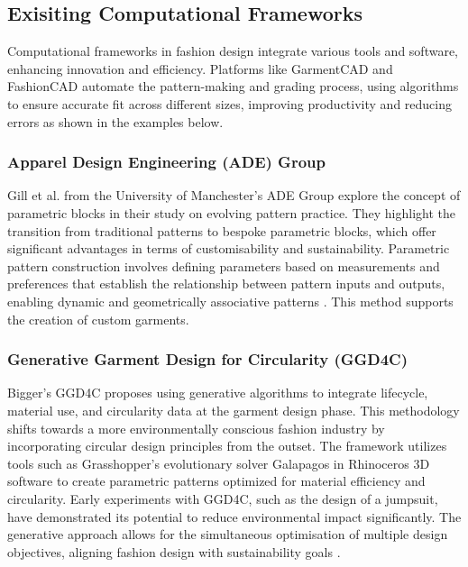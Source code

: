 \subsection{Exisiting Computational Frameworks}
Computational frameworks in fashion design integrate various tools and software, enhancing innovation and efficiency. Platforms like GarmentCAD and FashionCAD automate the pattern-making and grading process, using algorithms to ensure accurate fit across different sizes, improving productivity and reducing errors as shown in the examples below.

\subsubsection{Apparel Design Engineering (ADE) Group}
Gill et al. from the University of Manchester's ADE Group explore the concept of parametric blocks in their study on evolving pattern practice. They highlight the transition from traditional patterns to bespoke parametric blocks, which offer significant advantages in terms of customisability and sustainability. Parametric pattern construction involves defining parameters based on measurements and preferences that establish the relationship between pattern inputs and outputs, enabling dynamic and geometrically associative patterns \cite{gill_evolving_2023}. This method supports the creation of custom garments.

\subsubsection{Generative Garment Design for Circularity (GGD4C)}
Bigger's GGD4C proposes using generative algorithms to integrate lifecycle, material use, and circularity data at the garment design phase. This methodology shifts towards a more environmentally conscious fashion industry by incorporating circular design principles from the outset. The framework utilizes tools such as Grasshopper's evolutionary solver Galapagos in Rhinoceros 3D software to create parametric patterns optimized for material efficiency and circularity. Early experiments with GGD4C, such as the design of a jumpsuit, have demonstrated its potential to reduce environmental impact significantly. The generative approach allows for the simultaneous optimisation of multiple design objectives, aligning fashion design with sustainability goals \cite{bigger_generative_2021}.

